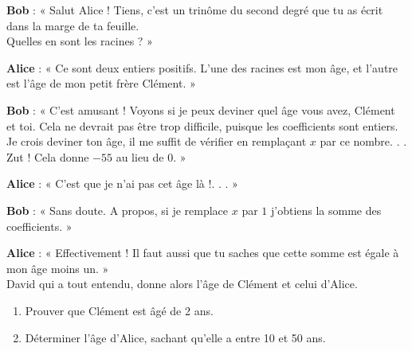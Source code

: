 
%
\textbf{Bob} : « Salut Alice ! Tiens, c'est un trinôme du second degré que tu as écrit dans la marge de ta feuille.
\\
Quelles en sont les racines ? »
\par
\textbf{Alice} : « Ce sont deux entiers positifs. L'une des racines est mon âge, et l'autre est l'âge de mon petit frère Clément. »
\par
\textbf{Bob} : « C'est amusant ! Voyons si je peux deviner quel âge vous avez, Clément et toi. Cela ne devrait pas être trop difficile, puisque les coefficients sont entiers. Je crois deviner ton âge, il me suffit de vérifier en remplaçant $x$ par ce nombre. . .
\\
Zut ! Cela donne $-55$ au lieu de $0$. »
\par
\textbf{Alice} : « C'est que je n'ai pas cet âge là !. . . »
\par
\textbf{Bob} : « Sans doute. A propos, si je remplace $x$ par $1$ j'obtiens la somme des coefficients. »
\par
\textbf{Alice} : « Effectivement ! Il faut aussi que tu saches que cette somme est égale à mon âge moins un. »
\\
David qui a tout entendu, donne alors l'âge de Clément et celui d'Alice.
\begin{enumerate}
     \item
     Prouver que Clément est âgé de 2 ans.
     \item
     Déterminer l'âge d'Alice, sachant qu'elle a entre 10 et 50 ans.
\end{enumerate}
\begin{corrige}
\end{corrige}
